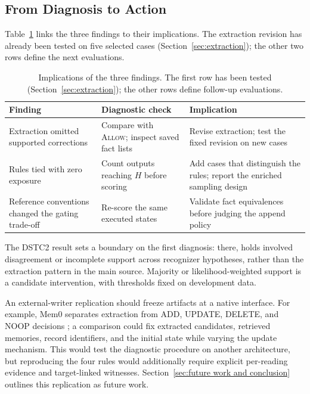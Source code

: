 \documentclass[acmsmall,review]{acmart}
\newcommand{\allow}{\textsc{Allow}}
\begin{document}
\subsection{From Diagnosis to Action}\label{sec:action}
Table~\ref{tab:diag} links the three findings to their implications. The extraction revision has already been tested on five selected cases (Section~\ref{sec:extraction}); the other two rows define the next evaluations.

\begin{table}[tbp]
\centering
\caption{Implications of the three findings. The first row has been tested (Section~\ref{sec:extraction}); the other rows define follow-up evaluations.}\label{tab:diag}
\small
\setlength{\tabcolsep}{3pt}
\begin{tabular}{@{}>{\raggedright\arraybackslash}p{}>{\raggedright\arraybackslash}p{}>{\raggedright\arraybackslash}p{}@{}}
\toprule
\textbf{Finding} & \textbf{Diagnostic check} & \textbf{Implication} \\
\midrule
Extraction omitted supported corrections & Compare with \allow{}; inspect saved fact lists & Revise extraction; test the fixed revision on new cases \\
\addlinespace[2pt]
Rules tied with zero exposure & Count outputs reaching $H$ before scoring & Add cases that distinguish the rules; report the enriched sampling design \\
\addlinespace[2pt]
Reference conventions changed the gating trade-off & Re-score the same executed states & Validate fact equivalences before judging the append policy \\
\bottomrule
\end{tabular}
\end{table}

The DSTC2 result sets a boundary on the first diagnosis: there, holds involved disagreement or incomplete support across recognizer hypotheses, rather than the extraction pattern in the main source. Majority or likelihood-weighted support is a candidate intervention, with thresholds fixed on development data.

An external-writer replication should freeze artifacts at a native interface. For example, Mem0 separates extraction from ADD, UPDATE, DELETE, and NOOP decisions \cite{cite6}; a comparison could fix extracted candidates, retrieved memories, record identifiers, and the initial state while varying the update mechanism. This would test the diagnostic procedure on another architecture, but reproducing the four rules would additionally require explicit per-reading evidence and target-linked witnesses. Section~\ref{sec:future work and conclusion} outlines this replication as future work.
\end{document}
